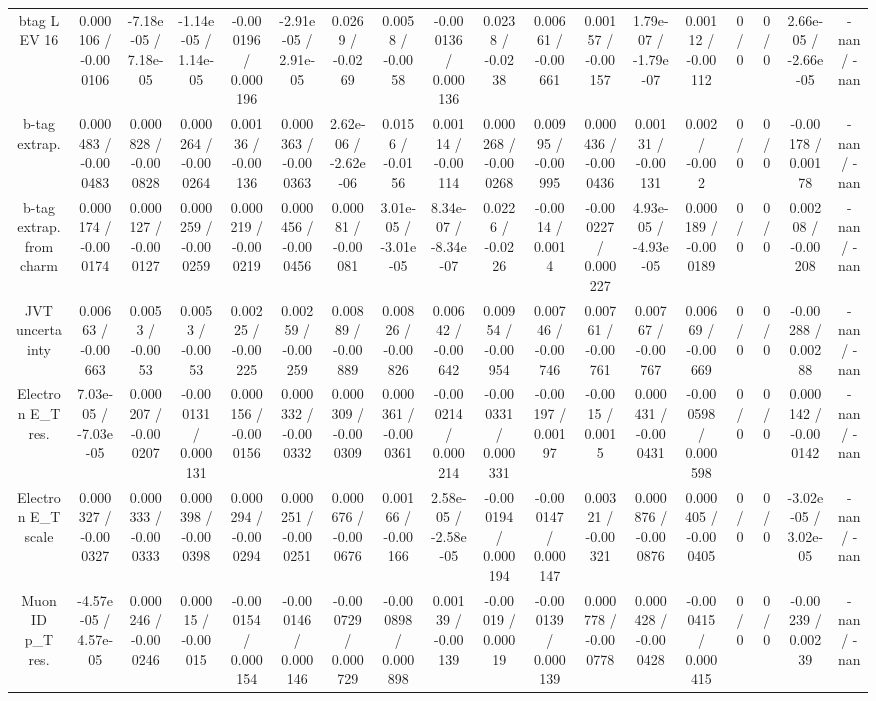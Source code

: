 \documentclass[10pt]{article}
\begin{document}
\begin{table}[htbp]
\begin{center}
\begin{tabular}{|c|c|c|c|c|c|c|c|c|c|c|c|c|c|c|c|c|c|}
  btag L EV 16 & 0.000106 / -0.000106 & -7.18e-05 / 7.18e-05 & -1.14e-05 / 1.14e-05 & -0.000196 / 0.000196 & -2.91e-05 / 2.91e-05 & 0.0269 / -0.0269 & 0.0058 / -0.0058 & -0.000136 / 0.000136 & 0.0238 / -0.0238 & 0.00661 / -0.00661 & 0.00157 / -0.00157 & 1.79e-07 / -1.79e-07 & 0.00112 / -0.00112 & 0 / 0 & 0 / 0 & 2.66e-05 / -2.66e-05 & -nan / -nan \\ 
  b-tag extrap. & 0.000483 / -0.000483 & 0.000828 / -0.000828 & 0.000264 / -0.000264 & 0.00136 / -0.00136 & 0.000363 / -0.000363 & 2.62e-06 / -2.62e-06 & 0.0156 / -0.0156 & 0.00114 / -0.00114 & 0.000268 / -0.000268 & 0.00995 / -0.00995 & 0.000436 / -0.000436 & 0.00131 / -0.00131 & 0.002 / -0.002 & 0 / 0 & 0 / 0 & -0.00178 / 0.00178 & -nan / -nan \\ 
  b-tag extrap. from charm & 0.000174 / -0.000174 & 0.000127 / -0.000127 & 0.000259 / -0.000259 & 0.000219 / -0.000219 & 0.000456 / -0.000456 & 0.00081 / -0.00081 & 3.01e-05 / -3.01e-05 & 8.34e-07 / -8.34e-07 & 0.0226 / -0.0226 & -0.0014 / 0.0014 & -0.000227 / 0.000227 & 4.93e-05 / -4.93e-05 & 0.000189 / -0.000189 & 0 / 0 & 0 / 0 & 0.00208 / -0.00208 & -nan / -nan \\ 
  JVT uncertainty & 0.00663 / -0.00663 & 0.0053 / -0.0053 & 0.0053 / -0.0053 & 0.00225 / -0.00225 & 0.00259 / -0.00259 & 0.00889 / -0.00889 & 0.00826 / -0.00826 & 0.00642 / -0.00642 & 0.00954 / -0.00954 & 0.00746 / -0.00746 & 0.00761 / -0.00761 & 0.00767 / -0.00767 & 0.00669 / -0.00669 & 0 / 0 & 0 / 0 & -0.00288 / 0.00288 & -nan / -nan \\ 
  Electron E_{T} res. & 7.03e-05 / -7.03e-05 & 0.000207 / -0.000207 & -0.000131 / 0.000131 & 0.000156 / -0.000156 & 0.000332 / -0.000332 & 0.000309 / -0.000309 & 0.000361 / -0.000361 & -0.000214 / 0.000214 & -0.000331 / 0.000331 & -0.00197 / 0.00197 & -0.0015 / 0.0015 & 0.000431 / -0.000431 & -0.000598 / 0.000598 & 0 / 0 & 0 / 0 & 0.000142 / -0.000142 & -nan / -nan \\ 
  Electron E_{T} scale & 0.000327 / -0.000327 & 0.000333 / -0.000333 & 0.000398 / -0.000398 & 0.000294 / -0.000294 & 0.000251 / -0.000251 & 0.000676 / -0.000676 & 0.00166 / -0.00166 & 2.58e-05 / -2.58e-05 & -0.000194 / 0.000194 & -0.000147 / 0.000147 & 0.00321 / -0.00321 & 0.000876 / -0.000876 & 0.000405 / -0.000405 & 0 / 0 & 0 / 0 & -3.02e-05 / 3.02e-05 & -nan / -nan \\ 
  Muon ID p_{T} res. & -4.57e-05 / 4.57e-05 & 0.000246 / -0.000246 & 0.00015 / -0.00015 & -0.000154 / 0.000154 & -0.000146 / 0.000146 & -0.000729 / 0.000729 & -0.000898 / 0.000898 & 0.00139 / -0.00139 & -0.00019 / 0.00019 & -0.000139 / 0.000139 & 0.000778 / -0.000778 & 0.000428 / -0.000428 & -0.000415 / 0.000415 & 0 / 0 & 0 / 0 & -0.00239 / 0.00239 & -nan / -nan \\ 

\end{tabular}
\end{center}
\end{table}
\end{document}
